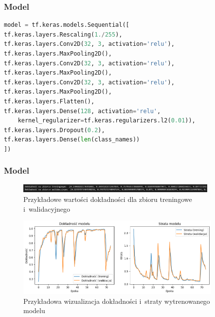 \begin{frame}[fragile]
    \frametitle{Model}

    \begin{lstlisting}[language=Python,caption=Listing skryptu tworzącego model z~walidacją krzyżową
        oraz uczonym na~wszystkich wariantach liczby wierzchołków grafów,basicstyle=\ttfamily\small]
model = tf.keras.models.Sequential([
tf.keras.layers.Rescaling(1./255),
tf.keras.layers.Conv2D(32, 3, activation='relu'),
tf.keras.layers.MaxPooling2D(),
tf.keras.layers.Conv2D(32, 3, activation='relu'),
tf.keras.layers.MaxPooling2D(),
tf.keras.layers.Conv2D(32, 3, activation='relu'),
tf.keras.layers.MaxPooling2D(),
tf.keras.layers.Flatten(),
tf.keras.layers.Dense(128, activation='relu',
    kernel_regularizer=tf.keras.regularizers.l2(0.01)),
tf.keras.layers.Dropout(0.2),
tf.keras.layers.Dense(len(class_names))
])
    \end{lstlisting}

\end{frame}

\begin{frame}
    \frametitle{Model}

    \begin{figure}[ht]
        \centering
        \includegraphics[width=10cm]{../thesis/resources/model/images/scr-standard-result.png}
        \caption{Przykładowe wartości dokładności dla zbioru treningowe i~walidacyjnego}
    \end{figure}
    
    \begin{figure}[ht]
        \centering
        \includegraphics[height=4cm]{../thesis/resources/model/images/v2_epoch75.png}
        \caption{Przykładowa wizualizacja dokładności i~straty wytrenowanego modelu}
    \end{figure}

\end{frame}